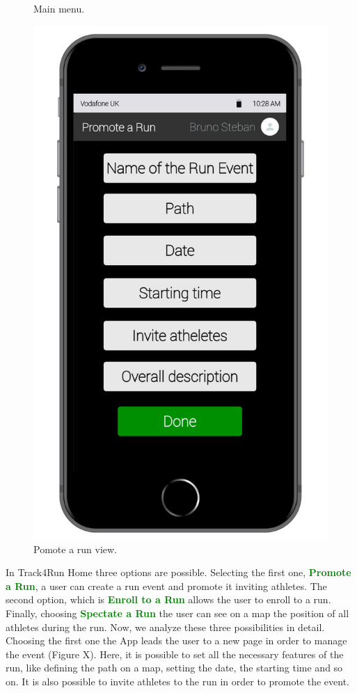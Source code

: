\begin{enumerate}
\begin{figure}[H]
\begin{center}
\begin{minipage}[c]{.40\textwidth}
	\caption{Main menu.}
        \end{minipage}%
        \hspace{10mm}%
        \begin{minipage}[c]{.40\textwidth}
        \centering
          \includegraphics[height=14 cm]{Images/Mockups/Track4RunMockup6.jpg}
	\caption{Pomote a run view.}
        \end{minipage}
      \end{center}
\end{figure}
In Track4Run Home three options are possible. Selecting the first one, {\textcolor{Green}{\textbf{Promote a Run}}}, a user can create a run event and promote it inviting athletes. The second option, which is {\textcolor{Green}{\textbf{Enroll to a Run}}} allows the user to enroll to a run. Finally, choosing {\textcolor{Green}{\textbf{Spectate a Run}}} the user can see on a map the position of all athletes during the run. Now, we analyze these three possibilities in detail. Choosing the first one the App leads the user to a new page in order to manage the event (Figure X). Here, it is possible to set all the necessary features of the run, like defining the path on a map, setting the date, the starting time and so on. It is also possible to invite athletes to the run in order to promote the event.

\end{enumerate}
